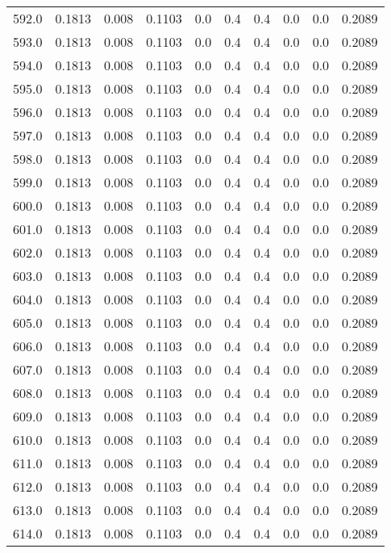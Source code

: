 \begin{longtable}{lrrrrrrrrr}
592.0 & 0.1813 & 0.008 & 0.1103 & 0.0 & 0.4 & 0.4 & 0.0 & 0.0 & 0.2089 \\
593.0 & 0.1813 & 0.008 & 0.1103 & 0.0 & 0.4 & 0.4 & 0.0 & 0.0 & 0.2089 \\
594.0 & 0.1813 & 0.008 & 0.1103 & 0.0 & 0.4 & 0.4 & 0.0 & 0.0 & 0.2089 \\
595.0 & 0.1813 & 0.008 & 0.1103 & 0.0 & 0.4 & 0.4 & 0.0 & 0.0 & 0.2089 \\
596.0 & 0.1813 & 0.008 & 0.1103 & 0.0 & 0.4 & 0.4 & 0.0 & 0.0 & 0.2089 \\
597.0 & 0.1813 & 0.008 & 0.1103 & 0.0 & 0.4 & 0.4 & 0.0 & 0.0 & 0.2089 \\
598.0 & 0.1813 & 0.008 & 0.1103 & 0.0 & 0.4 & 0.4 & 0.0 & 0.0 & 0.2089 \\
599.0 & 0.1813 & 0.008 & 0.1103 & 0.0 & 0.4 & 0.4 & 0.0 & 0.0 & 0.2089 \\
600.0 & 0.1813 & 0.008 & 0.1103 & 0.0 & 0.4 & 0.4 & 0.0 & 0.0 & 0.2089 \\
601.0 & 0.1813 & 0.008 & 0.1103 & 0.0 & 0.4 & 0.4 & 0.0 & 0.0 & 0.2089 \\
602.0 & 0.1813 & 0.008 & 0.1103 & 0.0 & 0.4 & 0.4 & 0.0 & 0.0 & 0.2089 \\
603.0 & 0.1813 & 0.008 & 0.1103 & 0.0 & 0.4 & 0.4 & 0.0 & 0.0 & 0.2089 \\
604.0 & 0.1813 & 0.008 & 0.1103 & 0.0 & 0.4 & 0.4 & 0.0 & 0.0 & 0.2089 \\
605.0 & 0.1813 & 0.008 & 0.1103 & 0.0 & 0.4 & 0.4 & 0.0 & 0.0 & 0.2089 \\
606.0 & 0.1813 & 0.008 & 0.1103 & 0.0 & 0.4 & 0.4 & 0.0 & 0.0 & 0.2089 \\
607.0 & 0.1813 & 0.008 & 0.1103 & 0.0 & 0.4 & 0.4 & 0.0 & 0.0 & 0.2089 \\
608.0 & 0.1813 & 0.008 & 0.1103 & 0.0 & 0.4 & 0.4 & 0.0 & 0.0 & 0.2089 \\
609.0 & 0.1813 & 0.008 & 0.1103 & 0.0 & 0.4 & 0.4 & 0.0 & 0.0 & 0.2089 \\
610.0 & 0.1813 & 0.008 & 0.1103 & 0.0 & 0.4 & 0.4 & 0.0 & 0.0 & 0.2089 \\
611.0 & 0.1813 & 0.008 & 0.1103 & 0.0 & 0.4 & 0.4 & 0.0 & 0.0 & 0.2089 \\
612.0 & 0.1813 & 0.008 & 0.1103 & 0.0 & 0.4 & 0.4 & 0.0 & 0.0 & 0.2089 \\
613.0 & 0.1813 & 0.008 & 0.1103 & 0.0 & 0.4 & 0.4 & 0.0 & 0.0 & 0.2089 \\
614.0 & 0.1813 & 0.008 & 0.1103 & 0.0 & 0.4 & 0.4 & 0.0 & 0.0 & 0.2089 \\

\end{longtable}
